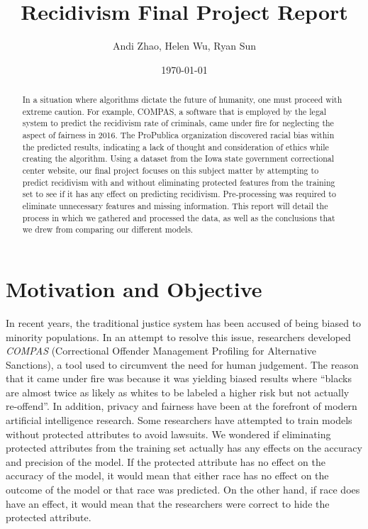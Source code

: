 \documentclass[11pt, sigconf]{acmart}
\begin{document}
\title{Recidivism Final Project Report}
\author{Andi Zhao, Helen Wu, Ryan Sun}
\date{\today}
\begin{abstract}
In a situation where algorithms dictate the future of humanity, one must proceed with extreme caution. For example, COMPAS, a software that is employed by the legal system to predict the recidivism rate of criminals, came under fire for neglecting the aspect of fairness in 2016. The ProPublica organization discovered racial bias within the predicted results, indicating a lack of thought and consideration of ethics while creating the algorithm. Using a dataset from the Iowa state government correctional center website, our final project focuses on this subject matter by attempting to predict recidivism with and without eliminating protected features from the training set to see if it has any effect on predicting recidivism. Pre-processing was required to eliminate unnecessary features and missing information. This report will detail the process in which we gathered and processed the data, as well as the conclusions that we drew from comparing our different models. 
\end{abstract}
\renewcommand\footnotetextcopyrightpermission[1]{}
\pagestyle{plain}
\maketitle

\section{Motivation and Objective}
\hspace{5mm}In recent years, the traditional justice system has been accused of being biased to minority populations. In an attempt to resolve this issue, researchers developed \emph{COMPAS} (Correctional Offender Management Profiling for Alternative Sanctions), a tool used to circumvent the need for human judgement. The reason that it came under fire was because it was yielding biased results where “blacks are almost twice as likely as whites to be labeled a higher risk but not actually re-offend”\cite{1}. In addition, privacy and fairness have been at the forefront of modern artificial intelligence research. Some researchers have attempted to train models without protected attributes to avoid lawsuits. We wondered if eliminating protected attributes from the training set actually has any effects on the accuracy and precision of the model. If the protected attribute has no effect on the accuracy of the model, it would mean that either race has no effect on the outcome of the model or that race was predicted. On the other hand, if race does have an effect, it would mean that the researchers were correct to hide the protected attribute. 
\end{document}
